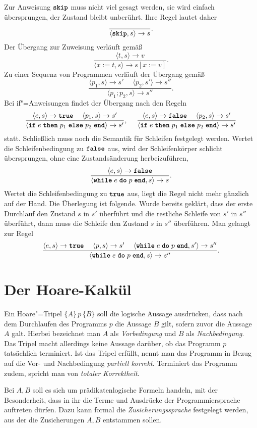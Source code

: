 Zur Anweisung $\kw{skip}$ muss nicht viel gesagt werden, sie wird einfach
übersprungen, der Zustand bleibt unberührt. Ihre Regel lautet daher
\[\dfrac{}{\langle\kw{skip},s\rangle\to s}.\]
Der Übergang zur Zuweisung verläuft gemäß
\[\dfrac{\langle t,s\rangle\to v}{\langle x:=t, s\rangle \to s[x:=v]}.\]
Zu einer Sequenz von Programmen verläuft der Übergang gemäß
\[\dfrac{\langle p_1,s\rangle\to s'\quad\;\langle p_2,s'\rangle\to s''}
{\langle p_1; p_2, s\rangle\to s''}.\]
Bei if"=Anweisungen findet der Übergang nach den Regeln
\[\dfrac{\langle e,s\rangle\to\kw{true}\quad\;\langle p_1,s\rangle\to s'}
{\langle\kw{if}\;e\;\kw{then}\;p_1\;\kw{else}\;p_2\;\kw{end}\rangle\to s'},\quad\;
\dfrac{\langle e,s\rangle\to\kw{false}\quad\;\langle p_2,s\rangle\to s'}
{\langle\kw{if}\;e\;\kw{then}\;p_1\;\kw{else}\;p_2\;\kw{end}\rangle\to s'}\]
statt. Schließlich muss noch die Semantik für Schleifen festgelegt werden.
Wertet die Schleifenbedingung zu $\kw{false}$ aus, wird der Schleifenkörper
schlicht übersprungen, ohne eine Zustandsänderung herbeizuführen,
\[\dfrac{\langle e,s\rangle\to\kw{false}}
{\langle\kw{while}\;e\;\kw{do}\;p\;\kw{end},s\rangle\to s}.\]
Wertet die Schleifenbedingung zu $\kw{true}$ aus, liegt die Regel
nicht mehr gänzlich auf der Hand. Die Überlegung ist folgende. Wurde
bereits geklärt, dass der erste Durchlauf den Zustand $s$ in $s'$
überführt und die restliche Schleife von $s'$ in $s''$ überführt,
dann muss die Schleife den Zustand $s$ in $s''$ überführen. Man gelangt
zur Regel
\[\dfrac{\langle e,s\rangle\to\kw{true}\quad\;\langle p,s\rangle\to s'\quad\;
\langle\kw{while}\;e\;\kw{do}\;p\;\kw{end},s'\rangle\to s''}
{\langle\kw{while}\;e\;\kw{do}\;p\;\kw{end},s\rangle\to s''}.\]

\section{Der Hoare-Kalkül}

Ein Hoare"=Tripel $\{A\}\,p\,\{B\}$ soll die logische Aussage ausdrücken,
dass nach dem Durchlaufen des Programms $p$ die Aussage $B$ gilt,
sofern zuvor die Aussage $A$ galt. Hierbei bezeichnet man $A$ als
\emph{Vorbedingung} und $B$ als \emph{Nachbedingung}. Das Tripel macht
allerdings keine Aussage darüber, ob das Programm $p$ tatsächlich
terminiert. Ist das Tripel erfüllt, nennt man das Programm in Bezug auf
die Vor- und Nachbedingung \emph{partiell korrekt}. Terminiert das Programm
zudem, spricht man von \emph{totaler Korrektheit}.

Bei $A,B$ soll es sich um prädikatenlogische Formeln handeln, mit der
Besonderheit, dass in ihr die Terme und Ausdrücke der Programmiersprache
auftreten dürfen. Dazu kann formal die \emph{Zusicherungssprache}
festgelegt werden, aus der die Zusicherungen $A,B$ entstammen sollen.


